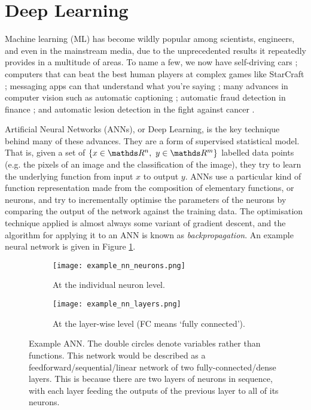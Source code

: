 \section*{Deep Learning}
Machine learning (ML) has become wildly popular among scientists, engineers, and even in the mainstream media, due to the unprecedented results it repeatedly provides in a multitude of areas. To name a few, we now have self-driving cars \cite{Fridman2019}; computers that can beat the best human players at complex games like StarCraft \cite{Vinyals2017}; messaging apps can that understand what you're saying \cite{Abdulkader2016, NIPS2015_5782}; many advances in computer vision such as automatic captioning \cite{Karpathy2017}; automatic fraud detection in finance \cite{DalPozzolo2015}; and automatic lesion detection in the fight against cancer \cite{Zlocha2019}.

Artificial Neural Networks (ANNs), or Deep Learning, is the key technique behind many of these advances. They are a form of supervised statistical model. That is, given a set of \(\{x \in \R^n, \ y \in \R^m\}\) labelled data points (e.g. the pixels of an image and the classification of the image), they try to learn the underlying function from input \(x\) to output \(y\). ANNs use a particular kind of function representation made from the composition of elementary functions, or neurons, and try to incrementally optimise the parameters of the neurons by comparing the output of the network against the training data. The optimisation technique applied is almost always some variant of gradient descent, and the algorithm for applying it to an ANN is known as \textit{backpropagation}. An example neural network is given in Figure \ref{fig:1-example-net}.

\begin{figure}[h]
    \centering
    \hspace{0.5cm}
    \begin{subfigure}[]{0.4\textwidth}
        \centering
        \texttt{[image: example\_nn\_neurons.png]}
        \caption{At the individual neuron level.}
    \end{subfigure}
    \hfill
    \begin{subfigure}[]{0.4\textwidth}
        \centering
        \texttt{[image: example\_nn\_layers.png]}
        \caption{At the layer-wise level (FC means `fully connected').}
    \end{subfigure}%
    \hspace{0.5cm}
    \caption{Example ANN. The double circles denote variables rather than functions. This network would be described as a feedforward/sequential/linear network of two fully-connected/dense layers. This is because there are two layers of neurons in sequence, with each layer feeding the outputs of the previous layer to all of its neurons.}
    \label{fig:1-example-net}
\end{figure}

